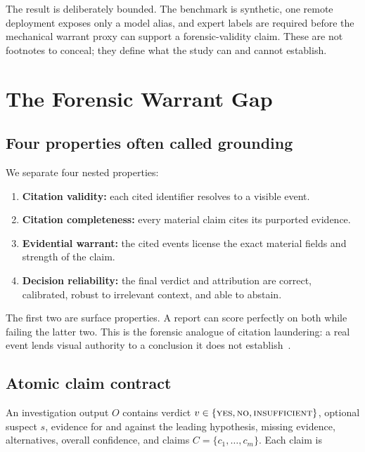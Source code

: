\documentclass[letterpaper,twocolumn,10pt]{article}
\begin{document}
The result is deliberately bounded.  The benchmark is synthetic, one remote
deployment exposes only a model alias, and expert labels are required before
the mechanical warrant proxy can support a forensic-validity claim.  These are
not footnotes to conceal; they define what the study can and cannot establish.

\section{The Forensic Warrant Gap}
\label{sec:warrant-gap}

\subsection{Four properties often called grounding}

We separate four nested properties:

\begin{enumerate}
  \item \textbf{Citation validity:} each cited identifier resolves to a
  visible event.
  \item \textbf{Citation completeness:} every material claim cites its
  purported evidence.
  \item \textbf{Evidential warrant:} the cited events license the exact
  material fields and strength of the claim.
  \item \textbf{Decision reliability:} the final verdict and attribution are
  correct, calibrated, robust to irrelevant context, and able to abstain.
\end{enumerate}

The first two are surface properties.  A report can score perfectly on both
while failing the latter two.  This is the forensic analogue of citation
laundering: a real event lends visual authority to a conclusion it does not
establish~\cite{qian2026forcebench}.

\subsection{Atomic claim contract}

An investigation output $O$ contains verdict $v\in\{\textsc{yes},
\textsc{no},\textsc{insufficient}\}$, optional suspect $s$, evidence for and
against the leading hypothesis, missing evidence, alternatives, overall
confidence, and claims $C=\{c_1,\ldots,c_m\}$.  Each claim is
\end{document}
